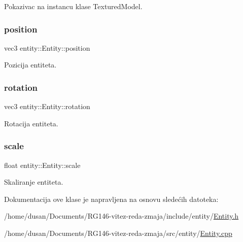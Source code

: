 Pokazivac na instancu klase Textured\+Model. 

\mbox{\label{classentity_1_1Entity_ad409c7f2085024479b276c2b6948bddb}} 
\subsubsection{\texorpdfstring{position}{position}}
{\footnotesize\ttfamily vec3 entity\+::\+Entity\+::position\hspace{0.3cm}{\ttfamily [private]}}



Pozicija entiteta. 

\mbox{\label{classentity_1_1Entity_aedb4c5dc1cfbc8cb3f6deb565ea920cb}} 
\subsubsection{\texorpdfstring{rotation}{rotation}}
{\footnotesize\ttfamily vec3 entity\+::\+Entity\+::rotation\hspace{0.3cm}{\ttfamily [private]}}



Rotacija entiteta. 

\mbox{\label{classentity_1_1Entity_a59e5d5e3575df70cd5c74b5d739d84ca}} 
\subsubsection{\texorpdfstring{scale}{scale}}
{\footnotesize\ttfamily float entity\+::\+Entity\+::scale\hspace{0.3cm}{\ttfamily [private]}}



Skaliranje entiteta. 



Dokumentacija ove klase je napravljena na osnovu sledećih datoteka\+:\begin{DoxyCompactItemize}
\item 
/home/dusan/\+Documents/\+R\+G146-\/vitez-\/reda-\/zmaja/include/entity/\hyperlink{Entity_8h}{Entity.\+h}\item 
/home/dusan/\+Documents/\+R\+G146-\/vitez-\/reda-\/zmaja/src/entity/\hyperlink{Entity_8cpp}{Entity.\+cpp}\end{DoxyCompactItemize}

